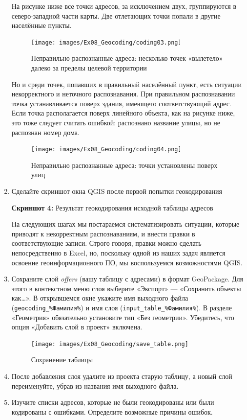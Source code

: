 \documentclass[
  12pt,
]{book}
\begin{document}
\begin{enumerate}
  На рисунке ниже все точки адресов, за исключением двух, группируются в северо-западной части карты. Две отлетающих точки попали в другие населённые пункты.

  \begin{figure}
  \centering
  \texttt{[image: images/Ex08\_Geocoding/coding03.png]}
  \caption{Неправильно распознанные адреса: несколько точек «вылетело» далеко за пределы целевой территории}
  \end{figure}

  Но и среди точек, попавших в правильный населённый пункт, есть ситуации некорректного и неточного распознавания. При правильном распознавании точка устанавливается поверх здания, имеющего соответствующий адрес. Если точка располагается поверх линейного объекта, как на рисунке ниже, это тоже следует считать ошибкой: распознано название улицы, но не распознан номер дома.

  \begin{figure}
  \centering
  \texttt{[image: images/Ex08\_Geocoding/coding04.png]}
  \caption{Неправильно распознанные адреса: точки установлены поверх улиц}
  \end{figure}
\item
  Сделайте скриншот окна QGIS после первой попытки геокодирования

  \textbf{Скриншот 4:} Результат геокодирования исходной таблицы адресов

  На следующих шагах мы постараемся систематизировать ситуации, которые приводят к некорректным распознаваниям, и внести правки в соответствующие записи. Строго говоря, правки можно сделать непосредственно в Excel, но, поскольку одной из наших задач является освоение геоинформационного ПО, мы воспользуемся возможностями QGIS.
\item
  Сохраните слой \emph{offers} (вашу таблицу с адресами) в формат GeoPackage. Для этого в контекстном меню слоя выберите «Экспорт» --- «Сохранить объекты как\ldots». В открывшемся окне укажите имя выходного файла (\texttt{geocoding\_\%Фамилия\%}) и имя слоя (\texttt{input\_table\_\%Фамилия\%}). В разделе «Геометрия» обязательно установите тип «Без геометрии». Убедитесь, что опция «Добавить слой в проект» включена.

  \begin{figure}
  \centering
  \texttt{[image: images/Ex08\_Geocoding/save\_table.png]}
  \caption{Сохранение таблицы}
  \end{figure}
\item
  После добавления слоя удалите из проекта старую таблицу, а новый слой переименуйте, убрав из названия имя выходного файла.
\item
  Изучите списки адресов, которые не были геокодированы или были кодированы с ошибками. Определите возможные причины ошибок.


\end{enumerate}
\end{document}
